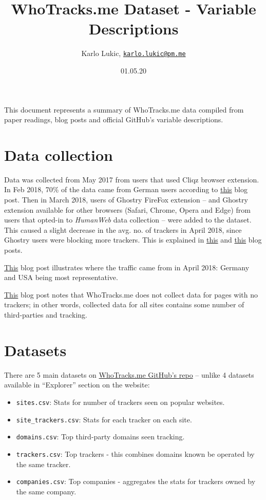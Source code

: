 \documentclass[
]{article}
\title{WhoTracks.me Dataset - Variable Descriptions}
\author{Karlo Lukic,
\href{mailto:karlo.lukic@pm.me}{\nolinkurl{karlo.lukic@pm.me}}}
\date{01.05.20}
\providecommand{\tightlist}{%
  \setlength{\itemsep}{0pt}\setlength{\parskip}{0pt}}
\begin{document}
\maketitle

This document represents a summary of WhoTracks.me data compiled from
paper readings, blog posts and official GitHub's variable descriptions.

\hypertarget{data-collection}{%
\section{Data collection}\label{data-collection}}

Data was collected from May 2017 from users that used Cliqz browser
extension. In Feb 2018, 70\% of the data came from German users
according to \href{https://t.ly/NQcD}{this} blog post. Then in March
2018, users of Ghostry FireFox extension -- and Ghostry extension
available for other browsers (Safari, Chrome, Opera and Edge) from users
that opted-in to \emph{HumanWeb} data collection -- were added to the
dataset. This caused a slight decrease in the avg. no. of trackers in
April 2018, since Ghostry users were blocking more trackers. This is
explained in \href{https://bit.ly/2VIBndZ}{this} and
\href{https://t.ly/BoCm}{this} blog posts.

\href{https://t.ly/BoCm}{This} blog post illustrates where the traffic
came from in April 2018: Germany and USA being most representative.

\href{https://bit.ly/2SJG2fj}{This} blog post notes that WhoTracks.me
does not collect data for pages with no trackers; in other words,
collected data for all sites contains some number of third-parties and
tracking.

\hypertarget{datasets}{%
\section{Datasets}\label{datasets}}

There are 5 main datasets on \href{https://bit.ly/39wiim0}{WhoTracks.me
GitHub's repo} -- unlike 4 datasets available in ``Explorer'' section on
the website:

\begin{itemize}
\tightlist
\item
  \texttt{sites.csv}: Stats for number of trackers seen on popular
  websites.
\item
  \texttt{site\_trackers.csv}: Stats for each tracker on each site.
\item
  \texttt{domains.csv}: Top third-party domains seen tracking.
\item
  \texttt{trackers.csv}: Top trackers - this combines domains known be
  operated by the same tracker.
\item
  \texttt{companies.csv}: Top companies - aggregates the stats for
  trackers owned by the same company.
\end{itemize}
\end{document}
